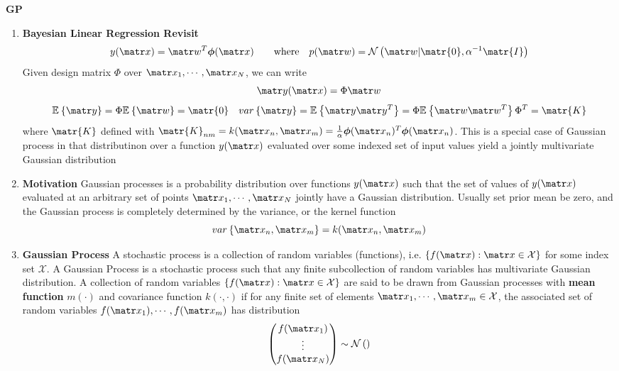 \documentclass[11pt]{article}
\begin{document}
\begin{defn*}
    \textbf{GP} 
    \begin{enumerate}
        \item \textbf{Bayesian Linear Regression Revisit} 
        \[
            y(\bx) = \bw^T \bphi(\bx) 
            \qquad \text{where} \quad 
            p(\bw) = \normal{\bw | \matr{0}, \alpha^{-1}\matr{I}}    
        \]
        Given design matrix $\Phi$ over $\bx_1, \cdots, \bx_N$, we can write
        \[
            \by(\bx) = \Phi \bw 
        \]
        \[
            \E{\by} = \Phi \E{\bw} = \matr{0}
            \quad 
            \var{\by} = \E{\by \by^T} = \Phi \E{\bw \bw^T} \Phi^T = \matr{K}
        \]
        where $\matr{K}$ defined with $\matr{K}_{nm} = k(\bx_n, \bx_m) = \textstyle \frac{1}{\alpha} \bphi(\bx_n)^T \bphi(\bx_n)$. This is a special case of Gaussian process in that distributinon over a function $y(\bx)$ evaluated over some indexed set of input values yield a jointly multivariate Gaussian distribution
        \item \textbf{Motivation} Gaussian processes is a probability distribution over functions $y(\bx)$ such that the set of values of $y(\bx)$ evaluated at an arbitrary set of points $\bx_1 ,\cdots , \bx_N$ jointly have a Gaussian distribution. Usually set prior mean be zero, and the Gaussian process is completely determined by the variance, or the kernel function 
        \[
            \var{\bx_n, \bx_m} = k(\bx_n, \bx_m)
        \]
        \item \textbf{Gaussian Process} A stochastic process is a collection of random variables (functions), i.e. $\{f(\bx): \bx\in \mathcal{X}\}$ for some index set $\mathcal{X}$. A Gaussian Process is a stochastic process such that any finite subcollection of random variables has multivariate Gaussian distribution. A collection of random variables $\{f(\bx): \bx\in \mathcal{X}\}$ are said to be drawn from Gaussian processes with \textbf{mean function} $m(\cdot)$ and covariance function $k(\cdot, \cdot)$ if for any finite set of elements $\bx_1, \cdots, \bx_m \in \mathcal{X}$, the associated set of random variables $f(\bx_1),\cdots, f(\bx_m)$ has distribution 
        \[
            \begin{pmatrix}
                f(\bx_1) \\
                \vdots \\
                f(\bx_N) \\ 
            \end{pmatrix}   
            \sim 
            \normal{
}\]
\end{enumerate}
\end{defn*}
\end{document}

